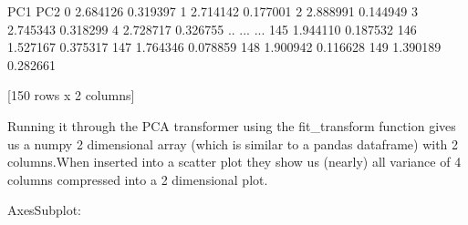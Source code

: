 \documentclass[letterpaper,10pt,english]{jupyterBook}
\begin{document}
\begin{sphinxVerbatim}[commandchars=\\\{\}]
  
 \PYG{p}{[} \PYG{p}{]}
\end{sphinxVerbatim}

\begin{sphinxVerbatim}[commandchars=\\\{\}]
          PC1       PC2
0   \PYGZhy{}2.684126  0.319397
1   \PYGZhy{}2.714142 \PYGZhy{}0.177001
2   \PYGZhy{}2.888991 \PYGZhy{}0.144949
3   \PYGZhy{}2.745343 \PYGZhy{}0.318299
4   \PYGZhy{}2.728717  0.326755
..        ...       ...
145  1.944110  0.187532
146  1.527167 \PYGZhy{}0.375317
147  1.764346  0.078859
148  1.900942  0.116628
149  1.390189 \PYGZhy{}0.282661

[150 rows x 2 columns]
\end{sphinxVerbatim}

\sphinxAtStartPar
Running it through the PCA transformer using the fit\_transform function gives us a numpy 2 dimensional array (which is similar to a pandas dataframe) with 2 columns.When inserted into a scatter plot they show us (nearly) all variance of 4 columns compressed into a 2 dimensional plot.

\begin{sphinxVerbatim}[commandchars=\\\{\}]
\PYG{p}{[}\PYG{p}{]} \PYG{p}{[}\PYG{p}{]} \PYG{p}{[}\PYG{p}{]}
\end{sphinxVerbatim}

\begin{sphinxVerbatim}[commandchars=\\\{\}]
\PYGZlt{}AxesSubplot:\PYGZgt{}
\end{sphinxVerbatim}

\noindent{}
\end{document}

